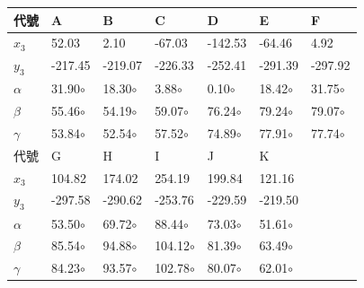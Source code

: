 \begin{figure}[htb!]
\begin{figure}[htb!]
\begin{figure}[htb!]
\begin{figure}[htb!]
\begin{figure}[htb!]
\begin{table}[htbp]
  \large
  \setlength{\tabcolsep}{0.75cm}
  \begin{tabular}{|p{2cm}|p{2cm}|p{2cm}|p{2cm}|p{2cm}|p{2cm}|p{2cm}|}
    \hline
    代號 & A & B & C & D & E & F \\
    \hline
    $x_3$ & 52.03 & 2.10 & -67.03 & -142.53 & -64.46 & 4.92  \\
    \hline
    $y_3$ & -217.45 & -219.07 & -226.33 & -252.41 & -291.39 & -297.92  \\
    \hline
    $\alpha$ & 31.90$\circ$ & 18.30$\circ$ & 3.88$\circ$ & 0.10$\circ$ & 18.42$\circ$ & 31.75$\circ$  \\
    \hline
    $\beta$ & 55.46$\circ$ & 54.19$\circ$ & 59.07$\circ$ & 76.24$\circ$ & 79.24$\circ$ & 79.07$\circ$  \\
    \hline
    $\gamma$ & 53.84$\circ$ & 52.54$\circ$ & 57.52$\circ$ & 74.89$\circ$ & 77.91$\circ$ & 77.74$\circ$ \\
    \hline
    代號 & G & H & I & J & K & ~ \\
    \hline
    $x_3$ & 104.82 & 174.02 & 254.19 & 199.84 & 121.16 & ~\\
    \hline
    $y_3$ & -297.58 & -290.62 & -253.76 & -229.59 & -219.50 & ~\\
    \hline
    $\alpha$ & 53.50$\circ$ & 69.72$\circ$ & 88.44$\circ$ & 73.03$\circ$ & 51.61$\circ$ & ~\\
    \hline
    $\beta$ & 85.54$\circ$ & 94.88$\circ$ & 104.12$\circ$ & 81.39$\circ$ & 63.49$\circ$ & ~\\
    \hline
    $\gamma$ & 84.23$\circ$ & 93.57$\circ$ & 102.78$\circ$ & 80.07$\circ$ & 62.01$\circ$ & ~\\
    \hline
  \end{tabular}
\end{table}


\end{figure}
\end{figure}
\end{figure}
\end{figure}
\end{figure}
